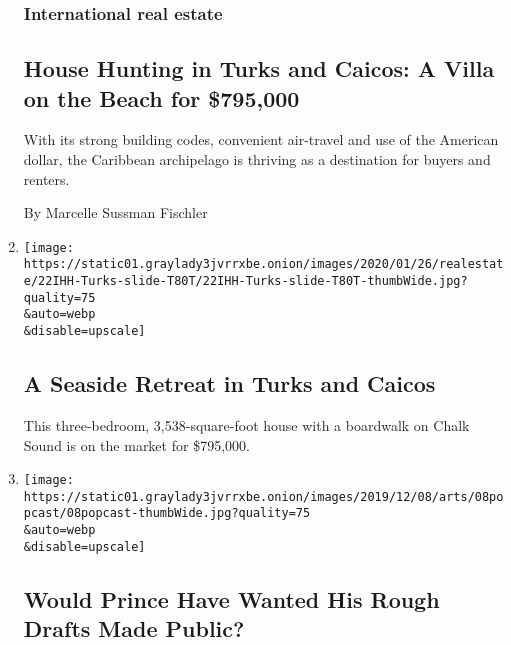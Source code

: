 \begin{enumerate}
  \hypertarget{international-real-estate}{%
  \subsubsection{International real
  estate}\label{international-real-estate}}

  \hypertarget{house-hunting-in-turks-and-caicos-a-villa-on-the-beach-for-795000}{%
  \subsection{House Hunting in Turks and Caicos: A Villa on the Beach
  for
  \$795,000}\label{house-hunting-in-turks-and-caicos-a-villa-on-the-beach-for-795000}}

  With its strong building codes, convenient air-travel and use of the
  American dollar, the Caribbean archipelago is thriving as a
  destination for buyers and renters.

  By Marcelle Sussman Fischler
\item
  \href{/slideshow/2020/01/22/realestate/a-seaside-retreat-in-turks-and-caicos.html}{}

  \texttt{[image: https://static01.graylady3jvrrxbe.onion/images/2020/01/26/realestate/22IHH-Turks-slide-T80T/22IHH-Turks-slide-T80T-thumbWide.jpg?quality=75\\\&auto=webp\\\&disable=upscale]}

  \hypertarget{a-seaside-retreat-in-turks-and-caicos}{%
  \subsection{A Seaside Retreat in Turks and
  Caicos}\label{a-seaside-retreat-in-turks-and-caicos}}

  This three-bedroom, 3,538-square-foot house with a boardwalk on Chalk
  Sound is on the market for \$795,000.
\item
  \href{/2019/12/08/arts/music/popcast-prince-unreleased.html}{}

  \texttt{[image: https://static01.graylady3jvrrxbe.onion/images/2019/12/08/arts/08popcast/08popcast-thumbWide.jpg?quality=75\\\&auto=webp\\\&disable=upscale]}

  \hypertarget{would-prince-have-wanted-his-rough-drafts-made-public}{%
  \subsection{Would Prince Have Wanted His Rough Drafts Made
  Public?}\label{would-prince-have-wanted-his-rough-drafts-made-public}}


\end{enumerate}
